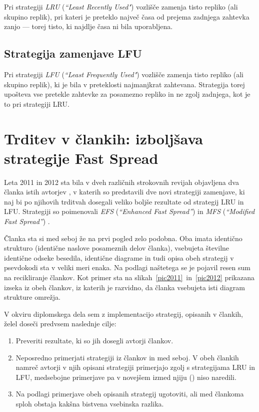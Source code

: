 \documentclass[a4paper, 12pt]{book}
\newcommand{\newterm}{\textit}
\begin{document}
Pri strategiji \newterm{LRU} (\newterm{``Least Recently Used"}) vozlišče
zamenja tisto repliko (ali skupino replik), pri kateri je preteklo največ
časa od prejema zadnjega zahtevka zanjo --- torej tisto, ki najdlje časa
ni bila uporabljena.

\subsection{Strategija zamenjave LFU}

Pri strategiji \newterm{LFU} (\newterm{``Least Frequently Used"}) vozlišče
zamenja tisto repliko (ali skupino replik), ki je bila v preteklosti
najmanjkrat zahtevana. Strategija torej upošteva vse pretekle zahtevke za
posamezno repliko in ne zgolj zadnjega, kot je to pri strategiji LRU.

\section{Trditev v člankih: izboljšava strategije Fast Spread}

Leta 2011 in 2012 sta bila v dveh različnih strokovnih revijah objavljena
dva članka istih avtorjev \cite{efs2011, mfs2012}, v katerih so predstavili dve
novi strategiji zamenjave, ki naj bi po njihovih trditvah dosegali veliko boljše
rezultate od strategij LRU in LFU. Strategiji so poimenovali \newterm{EFS}
(\newterm{``Enhanced Fast Spread''}) \cite{efs2011} in \newterm{MFS}
(\newterm{``Modified Fast Spread''}) \cite{mfs2012}.



Članka sta si med seboj že na prvi pogled zelo podobna. Oba imata identično
strukturo (identične naslove posameznih delov članka), vsebujeta številne
identične odseke besedila, identične diagrame in tudi opisa obeh strategij
v psevdokodi sta v veliki meri enaka. Na podlagi naštetega se je pojavil
resen sum na recikliranje člankov. Kot primer sta na
slikah~\ref{pic2011}~in~\ref{pic2012} prikazana izseka iz obeh člankov,
iz katerih je razvidno, da članka vsebujeta isti diagram strukture omrežja.

\begin{minipage}{\textwidth}

V okviru diplomskega dela sem z implementacijo strategij, opisanih v
člankih, želel doseči predvsem naslednje cilje:
\label{cilji}

\begin{enumerate}
\item Preveriti rezultate, ki so jih dosegli avtorji člankov.

\item Neposredno primerjati strategiji iz člankov \cite{efs2011} in
\cite{mfs2012} med seboj. V obeh člankih namreč avtorji v njih opisani
strategiji primerjajo zgolj s strategijama LRU in LFU, medsebojne
primerjave pa v novejšem izmed njiju (\cite{mfs2012}) niso naredili.

\item Na podlagi primerjave obeh opisanih strategij ugotoviti, ali med
član\-koma sploh obstaja kakšna bistvena vsebinska razlika.
\end{enumerate}

\end{minipage}
\end{document}
